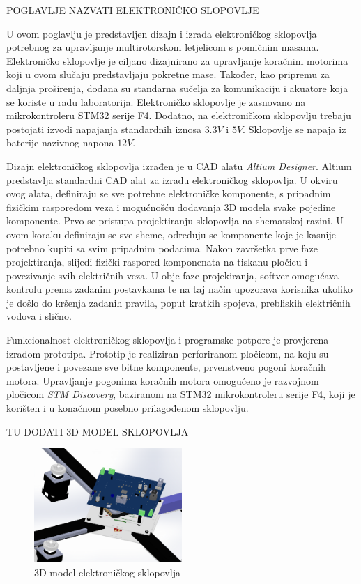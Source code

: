 \documentclass[11pt,a4paper]{article}
\begin{document}
POGLAVLJE NAZVATI ELEKTRONIČKO SLOPOVLJE

U ovom poglavlju je predstavljen dizajn i izrada elektroničkog sklopovlja potrebnog za upravljanje multirotorskom letjelicom s pomičnim masama. Elektroničko sklopovlje je ciljano dizajnirano za upravljanje koračnim motorima koji u ovom slučaju predstavljaju pokretne mase. Također, kao pripremu za daljnja proširenja, dodana su standarna sučelja za komunikaciju i akuatore koja se koriste u radu laboratorija. Elektroničko sklopovlje je zasnovano na mikrokontroleru STM32 serije F4. Dodatno, na elektroničkom sklopovlju trebaju postojati izvodi napajanja standardnih iznosa $3.3 V$ i $5 V$. Sklopovlje se napaja iz baterije nazivnog napona $12 V$. 

Dizajn elektroničkog sklopovlja izrađen je u CAD alatu \textit{Altium Designer}. Altium predstavlja standardni CAD alat za izradu elektroničkog sklopovlja. U okviru ovog alata, definiraju se sve potrebne elektroničke komponente, s pripadnim fizičkim rasporedom veza i mogućnošću dodavanja 3D modela svake pojedine komponente. Prvo se pristupa projektiranju sklopovlja na shematskoj razini. U ovom koraku definiraju se sve sheme, određuju se komponente koje je kasnije potrebno kupiti sa svim pripadnim podacima. Nakon završetka prve faze projektiranja, slijedi fizički raspored komponenata na tiskanu pločicu i povezivanje svih električnih veza. U obje faze projekiranja, softver omogućava kontrolu prema zadanim postavkama te na taj način upozorava korisnika ukoliko je došlo do kršenja zadanih pravila, poput kratkih spojeva, prebliskih električnih vodova i slično.

Funkcionalnost elektroničkog sklopovlja i programske potpore je provjerena izradom prototipa. Prototip je realiziran perforiranom pločicom, na koju su postavljene i povezane sve bitne komponente, prvenstveno pogoni koračnih motora. Upravljanje pogonima koračnih motora omogućeno je razvojnom pločicom \textit{STM Discovery}, baziranom na STM32 mikrokontroleru serije F4, koji je korišten i u konačnom posebno prilagođenom sklopovlju.

TU DODATI 3D MODEL SKLOPOVLJA

\begin{figure}[H]
	\centering
	\includegraphics[width=0.5\textwidth]{figures/arducopter_slot_pcb.png}
	\caption{3D model elektroničkog sklopovlja}
	\label{Slika:3D_PCB}
\end{figure}
\end{document}
